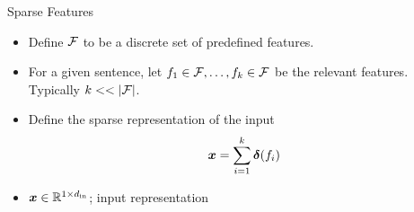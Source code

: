 \documentclass{beamer}
\begin{document}
\begin{frame}{Sparse Features}
  \begin{itemize}
  \item   Define $\mathcal{F}$ to be a discrete set of predefined features. 
  \item   For a given sentence, let $f_1\in\mathcal{F}, \ldots , f_k\in\mathcal{F}$ be the relevant features. 
    Typically $k << |\mathcal{F}|$.
  \item Define the sparse representation of the input
    \[\boldsymbol{x} = \sum_{i=1}^k \boldsymbol{\delta}(f_i) \]
  \item $\boldsymbol{x} \in \mathbb{R}^{1\times {d_{\mathrm{in}}}}$; input representation 
  \end{itemize}

\end{frame}
\end{document}
